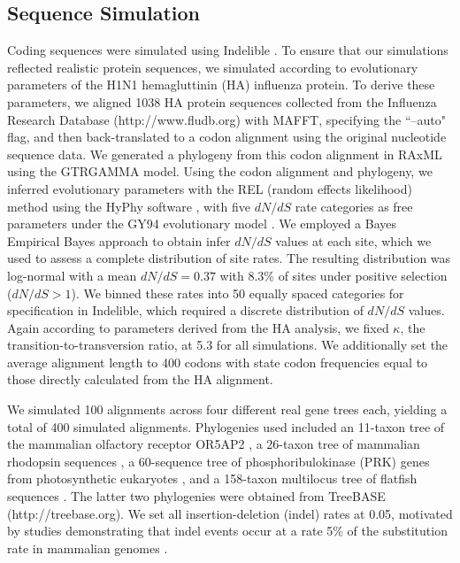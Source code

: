\documentclass[11pt]{article}
\begin{document}
\subsection*{Sequence Simulation}
Coding sequences were simulated using Indelible \citep{Fletcher2009}. To ensure that our simulations reflected realistic protein sequences, we simulated according to evolutionary parameters of the H1N1 hemagluttinin (HA) influenza protein. To derive these parameters, we aligned 1038 HA protein sequences collected from the Influenza Research Database (http://www.fludb.org) with MAFFT, specifying the ``--auto" flag, \citep{Katoh2002,Katoh2005} and then back-translated to a codon alignment using the original nucleotide sequence data. We generated a phylogeny from this codon alignment in RAxML \citep{Stamatakis2006} using the GTRGAMMA model. Using the codon alignment and phylogeny, we inferred evolutionary parameters with the REL (random effects likelihood)  method \citep{NielsenYang1998} using the HyPhy software \citep{Pond2005}, with five $dN/dS$ rate categories as free parameters under the GY94 evolutionary model \citep{GoldmanYang1994}. We employed a Bayes Empirical Bayes approach \citep{Yang2000} to obtain infer $dN/dS$ values at each site, which we used to assess a complete distribution of site rates. The resulting distribution was log-normal with a mean $dN/dS = 0.37$ with 8.3\% of sites  under positive selection ($dN/dS>1$). We binned these rates into 50 equally spaced categories for specification in Indelible, which required a discrete distribution of $dN/dS$ values. Again according to parameters derived from the HA analysis, we fixed $\kappa$, the transition-to-transversion ratio, at 5.3 for all simulations. We additionally set the average alignment length to 400 codons with state codon frequencies equal to those directly calculated from the HA alignment.

We simulated 100 alignments across four different real gene trees each, yielding a total of 400 simulated alignments. Phylogenies used included an 11-taxon tree of the mammalian olfactory receptor OR5AP2 \citep{Spielman2013}, a 26-taxon tree of mammalian rhodopsin sequences \citep{Spielman2013}, a 60-sequence tree of phosphoribulokinase (PRK) genes from photosynthetic eukaryotes \citep{Yang2011}, and a 158-taxon multilocus tree of flatfish sequences \citep{Betancur2013}. The latter two phylogenies were obtained from TreeBASE (http://treebase.org).
We set all insertion-deletion (indel) rates at 0.05, motivated by studies demonstrating that indel events occur at a rate 5\% of the substitution rate in mammalian genomes \citep{Cooper2004}.
\end{document}
